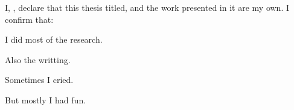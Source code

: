 \documentclass[
11pt, %
oneside, %
english, %
singlespacing, %
]{macthesis} %
\begin{document}

\tableofcontents %

\listoffigures %

\listoftables %



\begin{declaration}
\addchaptertocentry{\authorshipname}

\noindent I, \authorname, declare that this thesis titled, \emph{\ttitle} and the work presented in it are my own. I confirm that:

I did most of the research.

Also the writting.

Sometimes I cried.

But mostly I had fun.

\end{declaration}


\label{lastoffront}
\clearpage
\end{document}
